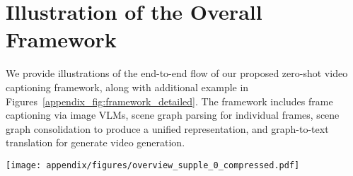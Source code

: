 
\section{Illustration of the Overall Framework}
\label{appendix_sec:detailed_overview}
We provide illustrations of the end-to-end flow of our proposed zero-shot video captioning framework, along with additional example in Figures~\ref{appendix_fig:framework_detailed}. 
The framework includes frame captioning via image VLMs, scene graph parsing for individual frames, scene graph consolidation to produce a unified representation, and graph-to-text translation for generate video generation.

\begin{figure*}[h!]
    \centering
                \texttt{[image: appendix/figures/overview\_supple\_0\_compressed.pdf]}
    \caption{Illustrations of the end-to-end flow of the proposed framework. The pipeline consists of: (1) frame captioning via image VLMs, (2) scene graph parsing for individual frames, (3) scene graph merging to produce a unified representation, and (4) graph-to-text transformation for final caption generation.}
    \label{appendix_fig:framework_detailed}
\end{figure*}